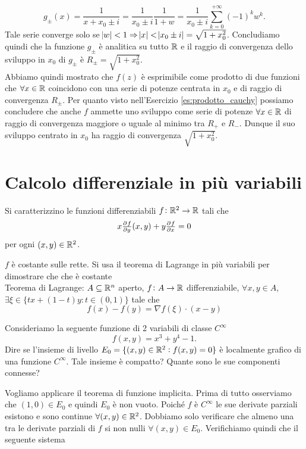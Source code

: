\documentclass[a4paper]{article}\par \usepackage{style}\par
\begin{document}
\begin{equation*}
  g_{\pm}(x) = \frac{1}{x + x_0 \pm i} = \frac{1}{x_0 \pm i} \frac{1}{1 + w} = \frac{1}{x_0 \pm i} \sum_{k = 0}^{+\infty}(-1)^k w^k.
\end{equation*}
Tale serie converge solo se $ \abs{w} < 1 \Rightarrow \abs{x} < \abs{x_0 \pm i} = \sqrt{1 + x_0^2} $. Concludiamo quindi che la funzione $ g_{\pm} $ è analitica su tutto $ \mathbb{R} $ e il raggio di convergenza dello sviluppo in $ x_0 $ di $ g_{\pm} $ è $ R_{\pm} = \sqrt{1 + x_0^2} $. \\
Abbiamo quindi mostrato che $ f(z) $ è esprimibile come prodotto di due funzioni che $ \forall x \in \mathbb{R} $ coincidono con una serie di potenze centrata in $ x_0 $ e di raggio di convergenza $ R_{\pm} $. Per quanto visto nell'Esercizio \ref{es:prodotto_cauchy} possiamo concludere che anche $ f $ ammette uno sviluppo come serie di potenze $ \forall x \in \mathbb{R} $ di raggio di convergenza maggiore o uguale al minimo tra $ R_+ $ e $ R_- $. Dunque il suo sviluppo centrato in $ x_0 $ ha raggio di convergenza $ \sqrt{1 + x_0^2} $.\par \section{Calcolo differenziale in più variabili}
\begin{es}
  Si caratterizzino le funzioni differenziabili $ f \colon \mathbb{R}^2 \to \mathbb{R} $ tali che \[ x \pd[]{f}{y}(x, y) + y \pd[]{f}{x} = 0\] per ogni $ (x, y) \in \mathbb{R}^2 $.
\end{es}\par $ f $ è costante sulle rette. Si usa il teorema di Lagrange in più variabili per dimostrare che che è costante \\
Teorema di Lagrange: $ A \subseteq \mathbb{R}^n $ aperto, $ f \colon A \to \mathbb{R} $ differenziabile, $ \forall x, y \in A $, $ \exists \xi \in \{tx + (1-t)y : t \in (0, 1)\} $ tale che
\begin{equation*}
  f(x) - f(y) = \nabla{f}(\xi) \cdot (x - y)
\end{equation*}\par 
\begin{es}
  Consideriamo la seguente funzione di 2 variabili di classe $ C^{\infty} $ \[f(x, y) = x^3 + y^4 - 1.\] Dire se l'insieme di livello $ E_0 = \{(x, y) \in \mathbb{R}^2 : f(x, y) = 0\} $ è localmente grafico di una funzione $ C^{\infty} $. Tale insieme è compatto? Quante sono le sue componenti connesse?
\end{es}\par Vogliamo applicare il teorema di funzione implicita. Prima di tutto osserviamo che $ (1, 0) \in E_0 $ e quindi $ E_0 $ è non vuoto. Poiché $ f $ è $ C^{\infty} $ le sue derivate parziali esistono e sono continue $ \forall (x, y) \in \mathbb{R}^2 $. Dobbiamo solo verificare che almeno una tra le derivate parziali di $ f $ si non nulli $ \forall (x, y) \in E_0 $. Verifichiamo quindi che il seguente sistema
\end{document}

